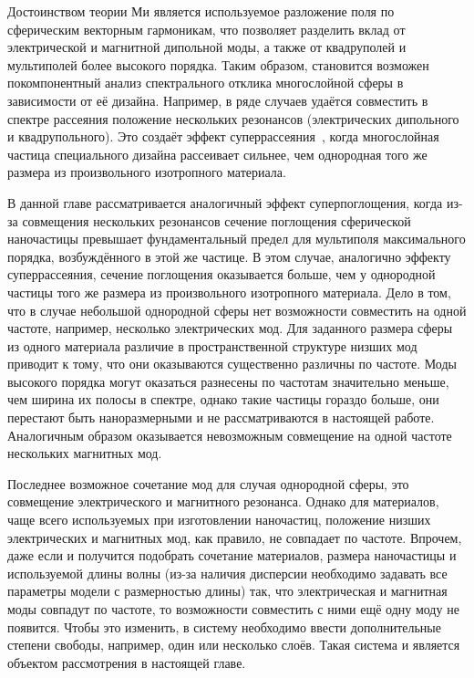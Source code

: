 Достоинством теории Ми является используемое разложение поля по
сферическим векторным гармоникам, что позволяет разделить вклад от электрической и магнитной дипольной моды, а также от квадруполей и мультиполей более высокого порядка. Таким образом,
становится возможен покомпонентный анализ спектрального отклика
многослойной сферы в зависимости от её дизайна. Например, в ряде
случаев удаётся совместить в спектре рассеяния положение нескольких
резонансов (электрических дипольного и квадрупольного). Это
создаёт эффект суперрассеяния~\cite{Fan-2010,Fan-2011}, когда
многослойная частица специального дизайна рассеивает сильнее, чем
однородная того же размера из произвольного изотропного
материала.

В данной главе рассматривается аналогичный эффект суперпоглощения,
когда из-за совмещения нескольких резонансов сечение поглощения
сферической наночастицы превышает фундаментальный предел для
мультиполя максимального порядка, возбуждённого в этой же частице.  В
этом случае, аналогично эффекту суперрассеяния, сечение поглощения
оказывается больше, чем у однородной частицы того же размера из
произвольного изотропного материала. Дело в том, что в случае
небольшой однородной сферы нет возможности совместить на одной
частоте, например, несколько электрических мод. Для заданного размера
сферы из одного материала различие в пространственной структуре низших
мод приводит к тому, что они оказываются существенно различны по
частоте. Моды высокого порядка могут оказаться разнесены по частотам
значительно меньше, чем ширина их полосы в спектре, однако такие
частицы гораздо больше, они перестают быть наноразмерными и не
рассматриваются в настоящей работе. Аналогичным образом оказывается
невозможным совмещение на одной частоте нескольких магнитных мод.

Последнее возможное сочетание мод для случая однородной сферы, это
совмещение электрического и магнитного резонанса. Однако для
материалов, чаще всего используемых при изготовлении наночастиц,
положение низших электрических и магнитных мод, как правило, не
совпадает по частоте.  Впрочем, даже если и получится подобрать
сочетание материалов, размера наночастицы и используемой длины волны
(из-за наличия дисперсии необходимо задавать все
параметры модели с размерностью длины) так, что электрическая и
магнитная моды совпадут по частоте, то возможности совместить с ними
ещё одну моду не появится.  Чтобы это изменить, в систему необходимо
ввести дополнительные степени свободы, например, один или несколько
слоёв. Такая система и является объектом рассмотрения в
настоящей главе.

